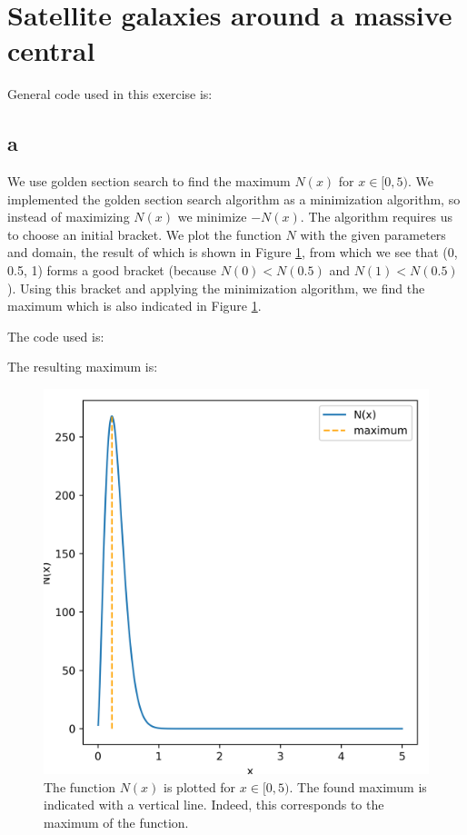 \section{Satellite galaxies around a massive central}

General code used in this exercise is:




\subsection{a}

We use golden section search to find the maximum $N(x)$ for $x\in[0,5)$.
We implemented the golden section search algorithm as a minimization algorithm,
so instead of maximizing $N(x)$ we minimize $-N(x)$.
The algorithm requires us to choose an initial bracket.
We plot the function $N$ with the given parameters and domain, the result of which is shown in Figure \ref{fig:max},
from which we see that (0, 0.5, 1) forms a good bracket (because $N(0)<N(0.5)$ and $N(1)<N(0.5)$). 
Using this bracket and applying the minimization algorithm, we find the maximum which is also indicated in Figure \ref{fig:max}.

The code used is:


The resulting maximum is:


\begin{figure}[h!]
    \centering
    \includegraphics[width=0.5\linewidth]{./my_solution_1a.png}
    \caption{The function $N(x)$ is plotted for $x\in[0,5)$. The found maximum is indicated with a vertical line.
    Indeed, this corresponds to the maximum of the function.}
    \label{fig:max}
\end{figure}



